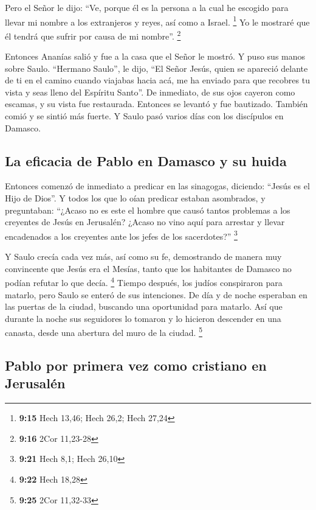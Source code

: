  Pero el Señor le dijo: ``Ve, porque él es la persona a
la cual he escogido para llevar mi nombre a los extranjeros y reyes, así
como a Israel. \footnote{\textbf{9:15} Hech 13,46; Hech 26,2; Hech 27,24}
 Yo le mostraré que él tendrá que sufrir por causa de mi
nombre''. \footnote{\textbf{9:16} 2Cor 11,23-28}

 Entonces Ananías salió y fue a la casa que el Señor le
mostró. Y puso sus manos sobre Saulo. ``Hermano Saulo'', le dijo, ``El
Señor Jesús, quien se apareció delante de ti en el camino cuando
viajabas hacia acá, me ha enviado para que recobres tu vista y seas
lleno del Espíritu Santo''.  De inmediato, de sus ojos
cayeron como escamas, y su vista fue restaurada. Entonces se levantó y
fue bautizado.  También comió y se sintió más fuerte. Y
Saulo pasó varios días con los discípulos en Damasco.

\hypertarget{la-eficacia-de-pablo-en-damasco-y-su-huida}{%
\subsection{La eficacia de Pablo en Damasco y su
huida}\label{la-eficacia-de-pablo-en-damasco-y-su-huida}}

 Entonces comenzó de inmediato a predicar en las
sinagogas, diciendo: ``Jesús es el Hijo de Dios''.  Y
todos los que lo oían predicar estaban asombrados, y preguntaban:
``¿Acaso no es este el hombre que causó tantos problemas a los creyentes
de Jesús en Jerusalén? ¿Acaso no vino aquí para arrestar y llevar
encadenados a los creyentes ante los jefes de los sacerdotes?''
\footnote{\textbf{9:21} Hech 8,1; Hech 26,10}

 Y Saulo crecía cada vez más, así como su fe, demostrando
de manera muy convincente que Jesús era el Mesías, tanto que los
habitantes de Damasco no podían refutar lo que decía. \footnote{\textbf{9:22}
  Hech 18,28}  Tiempo después, los judíos conspiraron
para matarlo,  pero Saulo se enteró de sus intenciones.
De día y de noche esperaban en las puertas de la ciudad, buscando una
oportunidad para matarlo.  Así que durante la noche sus
seguidores lo tomaron y lo hicieron descender en una canasta, desde una
abertura del muro de la ciudad. \footnote{\textbf{9:25} 2Cor 11,32-33}

\hypertarget{pablo-por-primera-vez-como-cristiano-en-jerusaluxe9n}{%
\subsection{Pablo por primera vez como cristiano en
Jerusalén}\label{pablo-por-primera-vez-como-cristiano-en-jerusaluxe9n}}

